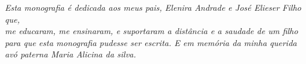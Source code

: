 \begin{dedicatoria}
   \vspace*{\fill}
   \centering
   \noindent

   \textit{Esta monografia é dedicada aos meus pais, Elenira Andrade e José Elieser Filho que,\\
   me educaram, me ensinaram, e suportaram a distância e a saudade de um filho para que esta monografia pudesse ser escrita. E em memória da minha querida avó paterna Maria Alicina da silva.} \vspace*{\fill}
\end{dedicatoria}
